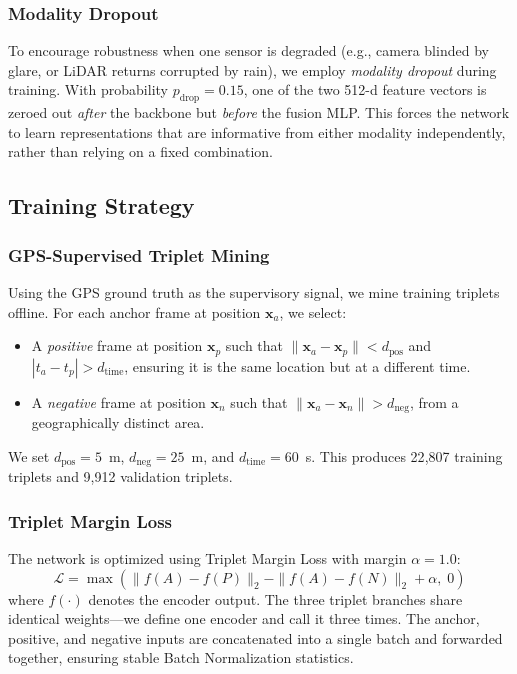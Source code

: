 \subsubsection{Modality Dropout}
To encourage robustness when one sensor is degraded (e.g., camera blinded by glare, or LiDAR returns corrupted by rain), we employ \emph{modality dropout} during training. With probability $p_{\text{drop}}{=}0.15$, one of the two 512-d feature vectors is zeroed out \emph{after} the backbone but \emph{before} the fusion MLP. This forces the network to learn representations that are informative from either modality independently, rather than relying on a fixed combination.

\subsection{Training Strategy}
\subsubsection{GPS-Supervised Triplet Mining}
Using the GPS ground truth as the supervisory signal, we mine training triplets offline. For each anchor frame at position $\mathbf{x}_a$, we select:
\begin{itemize}
    \item A \emph{positive} frame at position $\mathbf{x}_p$ such that $\|\mathbf{x}_a - \mathbf{x}_p\| < d_{\text{pos}}$ and $|t_a - t_p| > d_{\text{time}}$, ensuring it is the same location but at a different time.
    \item A \emph{negative} frame at position $\mathbf{x}_n$ such that $\|\mathbf{x}_a - \mathbf{x}_n\| > d_{\text{neg}}$, from a geographically distinct area.
\end{itemize}
We set $d_{\text{pos}} = 5$~m, $d_{\text{neg}} = 25$~m, and $d_{\text{time}} = 60$~s. This produces 22{,}807 training triplets and 9{,}912 validation triplets.

\subsubsection{Triplet Margin Loss}
The network is optimized using Triplet Margin Loss with margin $\alpha = 1.0$:
\begin{equation}
    \mathcal{L} = \max\left(\|f(A) - f(P)\|_2 - \|f(A) - f(N)\|_2 + \alpha,\; 0\right)
\end{equation}
where $f(\cdot)$ denotes the encoder output. The three triplet branches share identical weights—we define one encoder and call it three times. The anchor, positive, and negative inputs are concatenated into a single batch and forwarded together, ensuring stable Batch Normalization statistics.

